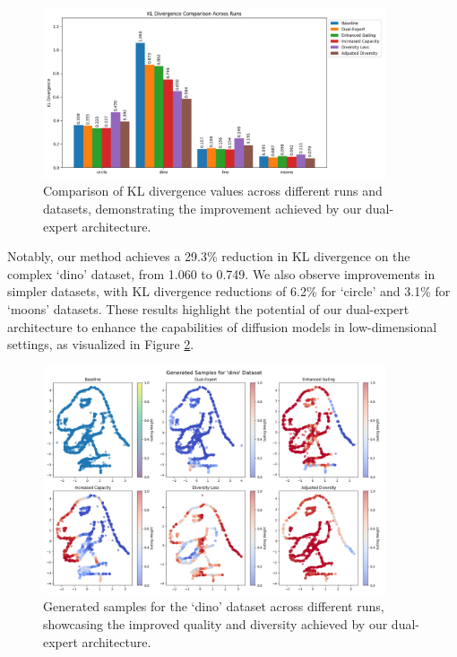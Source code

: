 \documentclass{article} %
\begin{document}
\begin{figure}[t]
    \centering
    \includegraphics[width=0.9\textwidth]{kl_divergence_comparison.png}
    \caption{Comparison of KL divergence values across different runs and datasets, demonstrating the improvement achieved by our dual-expert architecture.}
    \label{fig:kl_divergence_comparison}
\end{figure}

Notably, our method achieves a 29.3\% reduction in KL divergence on the complex `dino' dataset, from 1.060 to 0.749. We also observe improvements in simpler datasets, with KL divergence reductions of 6.2\% for `circle' and 3.1\% for `moons' datasets. These results highlight the potential of our dual-expert architecture to enhance the capabilities of diffusion models in low-dimensional settings, as visualized in Figure \ref{fig:dino_generated_samples}.

\begin{figure}[t]
    \centering
    \includegraphics[width=0.9\textwidth]{dino_generated_samples.png}
    \caption{Generated samples for the `dino' dataset across different runs, showcasing the improved quality and diversity achieved by our dual-expert architecture.}
    \label{fig:dino_generated_samples}
\end{figure}
\end{document}
